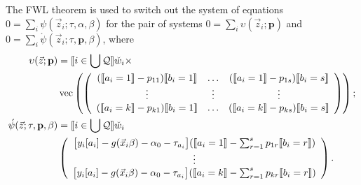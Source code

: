 \documentclass{article}
\DeclarePairedDelimiter{\indicator}{\llbracket}{\rrbracket}
\newcommand{\owt}[1][{[a_i]}]{\ensuremath{\check{w}_{i#1}}}
\newcommand{\absorbInterceptsEF}{\upsilon}
\begin{document}
The FWL theorem is used to switch out the system of equations
$0=\sum_{i}\psi(\vec{z}_{i}; \tau, \alpha, \beta)$
for the pair of systems $0 = \sum_{i}\absorbInterceptsEF(\vec{z}_{i}; \mathbf{p})$ and
$0= \sum_{i}\acute{\psi}(\vec{z}_{i}; \tau, \mathbf{p},
\beta)$,  where
\begin{align}
  \absorbInterceptsEF(\vec{z}; \mathbf{p}) &=
                                             \indicator{i \in \bigcup \mathcal{Q}} \owt[] \times \nonumber \\
  &\operatorname{vec}\left(%
    \left(
    \begin{array}{ccc}
      (\indicator{a_{i}=1}-p_{11})\indicator{b_{i}=1}
      &\ldots
      &
        (\indicator{a_{i}=1}-p_{1s})\indicator{b_{i}=s}
      \\
      \vdots & \vdots & \vdots \\
      (\indicator{a_{i}=k}-p_{k1})\indicator{b_{i}=1}
      &\ldots
      &
        (\indicator{a_{i}=k}-p_{ks})\indicator{b_{i}=s}\\                                      \end{array}
  \right)%
  \right) ;\nonumber \\
  \acute{\psi}(\vec{z}; \tau, \mathbf{p}, \beta) &=
\indicator{i \in \bigcup \mathcal{Q}}\owt[] \nonumber \\
&\left(
  \begin{array}{c}                                               
    \big[y_{i}[a_{i}]
    -
    g(\vec{x}_{i}\beta)-\alpha_{0}-\tau_{a_{i}}\big]
    (
    \indicator{a_{i}=1} - \sum_{r=1}^{s}p_{1r}\indicator{b_{i}=r})\\
    \vdots \\
    {}\big[y_{i}[a_{i}]
    - g(\vec{x}_{i}\beta) - \alpha_{0}-
    \tau_{a_{i}}\big]
    (\indicator{a_{i}=k}
    - \sum_{r=1}^{s}p_{kr}\indicator{b_{i}=r})\\                                             \end{array}
\right) . \label{eq:upsilondef}
\end{align}
\end{document}
